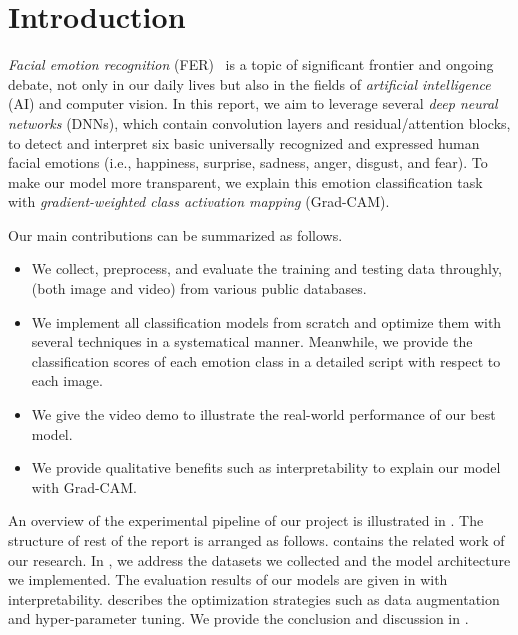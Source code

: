 \section{Introduction}
\label{sec:intro}

\textit{Facial emotion recognition} (FER)~\cite{Ko18,JainSS19} is a topic of significant frontier and ongoing debate, 
not only in our daily lives but also in the fields of \textit{artificial intelligence} (AI) and computer vision.
In this report, we aim to leverage several \textit{deep neural networks} (DNNs), 
which contain convolution layers and residual/attention blocks, 
to detect and interpret six basic universally recognized and expressed human facial emotions 
(i.e., happiness, surprise, sadness, anger, disgust, and fear). 
To make our model more transparent, 
we explain this emotion classification task with \textit{gradient-weighted class activation mapping} (Grad-CAM). 

Our main contributions can be summarized as follows.
\begin{itemize}
  \item We collect, preprocess, and evaluate the training and testing data throughly, 
  (both image and video) from various public databases. 
  \item We implement all classification models from scratch and optimize them with several techniques in a systematical manner. 
  Meanwhile, we provide the classification scores of each emotion class in a detailed script with respect to each image. 
  \item We give the video demo to illustrate the real-world performance of our best model.
  \item We provide qualitative benefits such as interpretability to explain our model with Grad-CAM. 
\end{itemize}

An overview of the experimental pipeline of our project is illustrated in . 
The structure of rest of the report is arranged as follows. 
 contains the related work of our research. 
In , 
we address the datasets we collected and the model architecture we implemented. 
The evaluation results of our models are given in  with interpretability. 
 describes the optimization strategies such as data augmentation and hyper-parameter tuning. 
We provide the conclusion and discussion in . 

